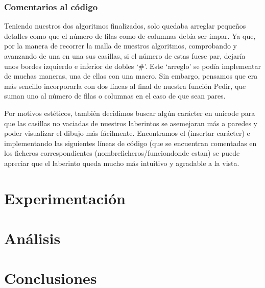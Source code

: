 \documentclass[12pt,a4paper]{article}
\begin{document}
\subsubsection{Comentarios al código}

Teniendo nuestros dos algoritmos finalizados, solo quedaba arreglar pequeños detalles como que el número de filas como de columnas debía ser impar. Ya que, por la manera de recorrer la malla de nuestros algoritmos, comprobando y avanzando de una en una sus casillas, si el número de estas fuese par, dejaría unos bordes izquierdo e inferior de dobles ‘\#’.  Este ‘arreglo’ se podía implementar de muchas maneras, una de ellas con una macro. Sin embargo, pensamos que era más sencillo incorporarla con dos líneas al final de nuestra función Pedir, que suman uno al número de filas o columnas en el caso de que sean pares. 

Por motivos estéticos, también decidimos buscar algún carácter en unicode para que las casillas no vaciadas de nuestros laberintos se asemejaran más a paredes y poder visualizar el dibujo más fácilmente. Encontramos el (insertar carácter) e implementando las siguientes líneas de código (que se encuentran comentadas en los ficheros correspondientes (nombreficheros/funciondonde estan) se puede apreciar que el laberinto queda mucho más intuitivo y agradable a la vista.  
\clearpage
\section{Experimentación}

\clearpage
\section{Análisis}

\clearpage
\section{Conclusiones}

\clearpage


\end{document}
